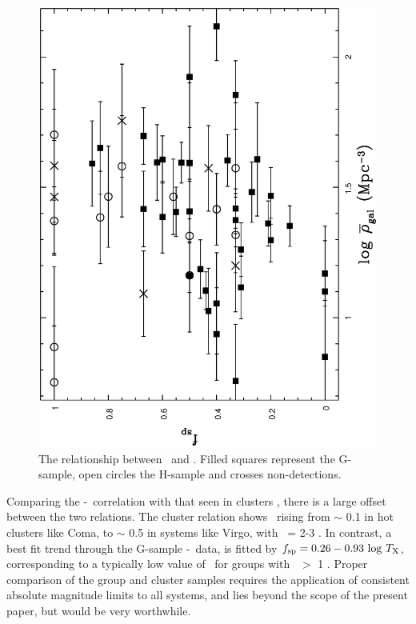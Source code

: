\documentclass[usenatbib]{mn2e}
\begin{document}
\begin{figure}
\begin{minipage}{241pt}
    \includegraphics[height=\linewidth,angle=270]{fig_26.ps}
    \caption{The relationship between \fsp\ and \dengal.  Filled squares
             represent the G-sample, open circles the H-sample and crosses
             non-detections.}
    \label{fig_fsp_dengal}

  \end{minipage}\hspace{18pt}
  \begin{minipage}{241pt}

  \end{minipage}
\end{figure}

Comparing the \fsp-\TX\ correlation with that seen in clusters \citep{edge91c},
there is a large offset between the two relations. The cluster relation shows
\fsp\ rising from $\sim$ 0.1 in hot clusters like Coma, to $\sim$ 0.5 in systems
like Virgo, with \TX\ = 2-3 \kev. In contrast, a best fit trend through the
G-sample \fsp-\TX\ data, is fitted by $f_{\mathrm{sp}} = 0.26-0.93\ \mathrm{log}\ T_{\mathrm{X}}$,
corresponding to a typically low value of \fsp\ for groups with \TX\ $>$ 1 \kev.
Proper comparison of the group and cluster samples requires the application of
consistent absolute magnitude limits to all systems, and lies beyond the scope
of the present paper, but would be very worthwhile.
\end{document}
